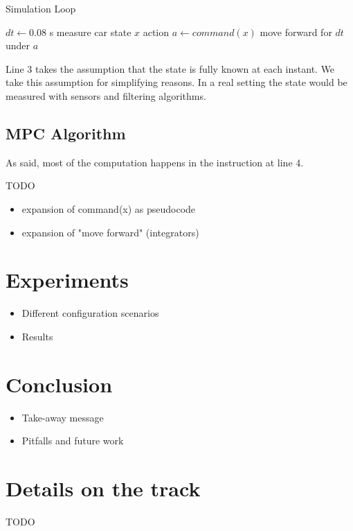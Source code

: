 \documentclass[a4paper, onecolumn, 12pt]{article}
\begin{document}
\begin{algorithm}
    \caption{Simulation Loop}\label{sim}
    \begin{algorithmic}[1]
        \State $dt \gets 0.08$ s 
        \State measure car state $x$
        \State action $a \gets command(x)$ 
        \State move forward for $dt$ under $a$ 
        \EndWhile
    \end{algorithmic}
\end{algorithm}

Line 3 takes the assumption that the state is fully known at each instant. We
take this assumption for simplifying reasons. In a real setting the state would
be measured with sensors and filtering algorithms.

\subsection{MPC Algorithm}
As said, most of the computation happens in the instruction at line 4.

TODO
\begin{itemize}
    \item expansion of command(x) as pseudocode
    \item expansion of "move forward" (integrators)
\end{itemize}


\section{Experiments}


\begin{itemize}
    \item Different configuration scenarios
    \item Results
\end{itemize}



\section{Conclusion}

\begin{itemize}
    \item Take-away message
    \item Pitfalls and future work
\end{itemize}


\newpage



\newpage
\appendix

\section{Details on the track}
\label{app:track}
TODO
\end{document}
